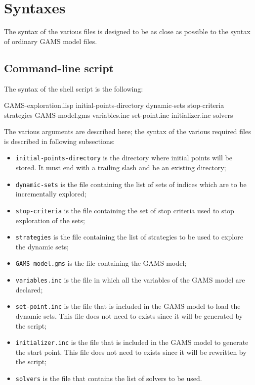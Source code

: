 \section*{Syntaxes}

The syntax of the various files is designed to be as close as possible to the
syntax of ordinary GAMS model files.

\subsection*{Command-line script}

The syntax of the shell script is the following:\\
\begin{tt}
  GAMS-exploration.lisp initial-points-directory dynamic-sets stop-criteria
  strategies GAMS-model.gms variables.inc set-point.inc initializer.inc solvers
\end{tt}

The various arguments are described here; the syntax of the various required
files is described in following subsections:
\begin{itemize}
\item \texttt{initial-points-directory} is the directory where initial points
  will be stored. It must end with a trailing slash and be an existing
  directory;
\item \texttt{dynamic-sets} is the file containing the list of sets of indices
  which are to be incrementally explored;
\item \texttt{stop-criteria} is the file containing the set of stop criteria
  used to stop exploration of the sets;
\item \texttt{strategies} is the file containing the list of strategies to be
  used to explore the dynamic sets;
\item \texttt{GAMS-model.gms} is the file containing the GAMS model;
\item \texttt{variables.inc} is the file in which all the variables of the GAMS
  model are declared;
\item \texttt{set-point.inc} is the file that is included in the GAMS model to
  load the dynamic sets. This file does not need to exists since it will be
  generated by the script;
\item \texttt{initializer.inc} is the file that is included in the GAMS model to
  generate the start point. This file does not need to exists since it will be
  rewritten by the script;
\item \texttt{solvers} is the file that contains the list of solvers to be used.
\end{itemize}

